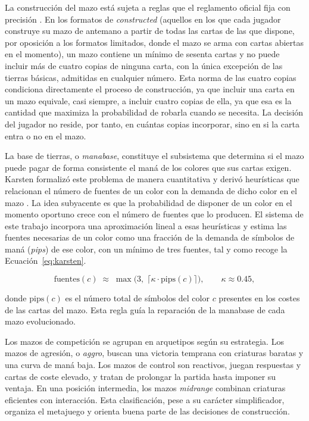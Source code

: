 La construcción del mazo está sujeta a reglas que el reglamento oficial fija con precisión \cite{wotc_rules}. En los formatos de \emph{constructed} (aquellos en los que cada jugador construye su mazo de antemano a partir de todas las cartas de las que dispone, por oposición a los formatos limitados, donde el mazo se arma con cartas abiertas en el momento), un mazo contiene un mínimo de sesenta cartas y no puede incluir más de cuatro copias de ninguna carta, con la única excepción de las tierras básicas, admitidas en cualquier número. Esta norma de las cuatro copias condiciona directamente el proceso de construcción, ya que incluir una carta en un mazo equivale, casi siempre, a incluir cuatro copias de ella, ya que esa es la cantidad que maximiza la probabilidad de robarla cuando se necesita. La decisión del jugador no reside, por tanto, en cuántas copias incorporar, sino en si la carta entra o no en el mazo.

La base de tierras, o \emph{manabase}, constituye el subsistema que determina si el mazo puede pagar de forma consistente el maná de los colores que sus cartas exigen. Karsten formalizó este problema de manera cuantitativa y derivó heurísticas que relacionan el número de fuentes de un color con la demanda de dicho color en el mazo \cite{karsten_manabase}. La idea subyacente es que la probabilidad de disponer de un color en el momento oportuno crece con el número de fuentes que lo producen. El sistema de este trabajo incorpora una aproximación lineal a esas heurísticas y estima las fuentes necesarias de un color como una fracción de la demanda de símbolos de maná (\emph{pips}) de ese color, con un mínimo de tres fuentes, tal y como recoge la Ecuación~\ref{eq:karsten}.

\begin{equation}
\text{fuentes}(c) \;\approx\; \max\bigl(3,\; \lceil \kappa \cdot \text{pips}(c) \rceil \bigr), \qquad \kappa \approx 0.45,
\label{eq:karsten}
\end{equation}

donde $\text{pips}(c)$ es el número total de símbolos del color $c$ presentes en los costes de las cartas del mazo. Esta regla guía la reparación de la manabase de cada mazo evolucionado.

Los mazos de competición se agrupan en arquetipos según su estrategia. Los mazos de agresión, o \emph{aggro}, buscan una victoria temprana con criaturas baratas y una curva de maná baja. Los mazos de control son reactivos, juegan respuestas y cartas de coste elevado, y tratan de prolongar la partida hasta imponer su ventaja. En una posición intermedia, los mazos \emph{midrange} combinan criaturas eficientes con interacción. Esta clasificación, pese a su carácter simplificador, organiza el metajuego y orienta buena parte de las decisiones de construcción.

